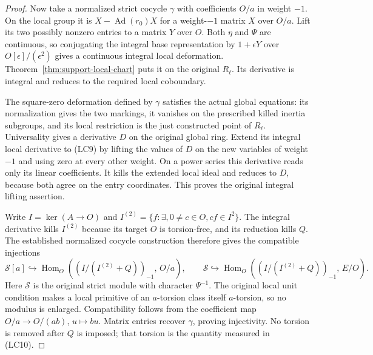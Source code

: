 \begin{proof}
Now take a normalized strict cocycle $\gamma$ with coefficients
$O/a$ in weight $-1$.  On the local group it is
$X-\operatorname{Ad}(r_0)X$ for a weight-$-1$ matrix $X$ over
$O/a$.  Lift its two possibly nonzero entries to a matrix $Y$ over
$O$.  Both $\eta$ and $\Psi$ are continuous, so conjugating the
integral base representation by $1+\epsilon Y$ over
$O[\epsilon]/(\epsilon^2)$ gives a continuous integral local
deformation.  Theorem~\ref{thm:support-local-chart} puts it on
the original $R_\ell$.  Its derivative is integral and reduces
to the required local coboundary.

The square-zero deformation defined by $\gamma$ satisfies the
actual global equations: its normalization gives the two markings,
it vanishes on the prescribed killed inertia subgroups, and its
local restriction is the just constructed point of $R_\ell$.
Universality gives a derivative $D$ on the original global ring.
Extend its integral local derivative to (LC9) by lifting the values
of $D$ on the new variables of weight $-1$ and using zero at every
other weight.  On a power series this derivative reads only its
linear coefficients.  It kills the extended local ideal and
reduces to $D$, because both agree on the entry coordinates.
This proves the original integral lifting assertion.

Write $I=\ker(A\to O)$ and
$I^{(2)}=\{f:\exists,0\ne c\in O, cf\in I^2\}$.
The integral derivative kills $I^{(2)}$ because its target $O$ is
torsion-free, and its reduction kills $Q$.  The established normalized
cocycle construction therefore gives the compatible injections
\[
 \mathcal S[a]\hookrightarrow
 \operatorname{Hom}_O\!\left(
    (I/(I^{(2)}+Q))_{-1},\,O/a\right),\qquad
 \mathcal S\hookrightarrow
 \operatorname{Hom}_O\!\left(
    (I/(I^{(2)}+Q))_{-1},\,E/O\right).                         \tag{LC10}
\]
Here $\mathcal S$ is the original strict module with character
$\Psi^{-1}$.  The original local unit condition makes a local
primitive of an $a$-torsion class itself $a$-torsion, so no modulus
is enlarged.  Compatibility follows from the coefficient map
$O/a\to O/(ab)$, $u\mapsto bu$.  Matrix entries recover
$\gamma$, proving injectivity.  No torsion is removed after $Q$
is imposed; that torsion is the quantity measured in (LC10).
\end{proof}

